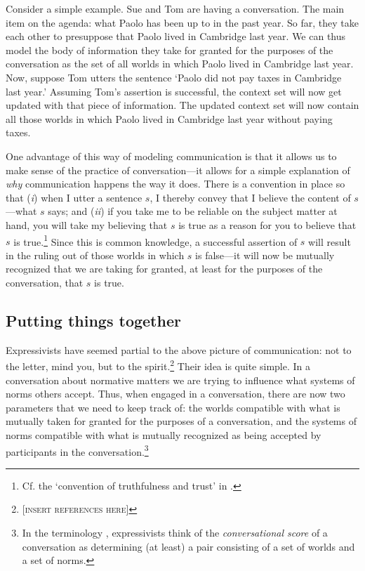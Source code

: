 \documentclass[11pt,article,oneside]{memoir}
\begin{document}
Consider a simple example. Sue and Tom are having a conversation. The main item on the agenda: what Paolo has been up to in the past year. So far, they take each other to presuppose that Paolo lived in Cambridge last year. We can thus model the body of information they take for granted for the purposes of the conversation as the set of all worlds in which Paolo lived in Cambridge last year. Now, suppose Tom utters the sentence `Paolo did not pay taxes in Cambridge last year.' Assuming Tom's assertion is successful, the context set will now get updated with that piece of information. The updated context set will now contain all those worlds in which Paolo lived in Cambridge last year without paying taxes. 

One advantage of this way of modeling communication is that it allows us to make sense of the practice of conversation---it allows for a simple explanation of \emph{why} communication happens the way it does. There is a convention in place so that (\emph{i}) when I utter a sentence $s$, I thereby convey that I believe the content of $s$---what $s$ says; and (\emph{ii}) if you take me to be reliable on the subject matter at hand, you will take my believing that $s$ is true as a reason for you to believe that $s$ is true.\footnote{Cf. the `convention of truthfulness and trust' in \citealt{lewis1975}.} Since this is common knowledge, a successful assertion of $s$ will result in the ruling out of those worlds in which $s$ is false---it will now be mutually recognized that we are taking for granted, at least for the purposes of the conversation, that $s$ is true.


\subsection{Putting things together}

Expressivists have seemed partial to the above picture of communication: not to the letter, mind you, but to the spirit.\footnote{[\textsc{insert references here}]} Their idea is quite simple. In a conversation about normative matters we are trying to influence what systems of norms others accept. Thus, when engaged in a conversation, there are now two parameters that we need to keep track of: the worlds compatible with what is mutually taken for granted for the purposes of a conversation, and the systems of norms compatible with what is mutually recognized as being accepted by participants in the conversation.\footnote{In the terminology \citealt{lewis1979}, expressivists think of the \emph{conversational score} of a conversation as determining (at least) a pair consisting of a set of worlds and a set of norms.} 
\end{document}
